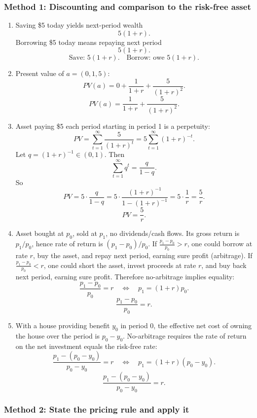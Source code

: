 \documentclass[12pt]{article}
\begin{document}
\subsubsection*{Method 1: Discounting and comparison to the risk-free asset}
\begin{enumerate}[label=(\alph*), leftmargin=*]
\item Saving \$5 today yields next-period wealth
\[
5(1+r).
\]
Borrowing \$5 today means repaying next period
\[
5(1+r).
\]
\[
\boxed{\text{Save: }5(1+r).\quad \text{Borrow: owe }5(1+r).}
\]

\item Present value of \(a=(0,1,5)\):
\[
PV(a)=0+\frac{1}{1+r}+\frac{5}{(1+r)^2}.
\]
\[
\boxed{PV(a)=\dfrac{1}{1+r}+\dfrac{5}{(1+r)^2}.}
\]

\item Asset paying \$5 each period starting in period 1 is a perpetuity:
\[
PV= \sum_{t=1}^{\infty}\frac{5}{(1+r)^t}
=5\sum_{t=1}^\infty (1+r)^{-t}.
\]
Let \(q=(1+r)^{-1}\in(0,1)\). Then
\[
\sum_{t=1}^\infty q^t=\frac{q}{1-q}.
\]
So
\[
PV=5\cdot \frac{q}{1-q}
=5\cdot \frac{(1+r)^{-1}}{1-(1+r)^{-1}}
=5\cdot \frac{1}{r}
=\frac{5}{r}.
\]
\[
\boxed{PV=\dfrac{5}{r}.}
\]

\item Asset bought at \(p_0\), sold at \(p_1\), no dividends/cash flows.
Its gross return is \(p_1/p_0\), hence rate of return is \((p_1-p_0)/p_0\).
If \(\frac{p_1-p_0}{p_0}>r\), one could borrow at rate \(r\), buy the asset, and repay next period, earning sure profit (arbitrage).
If \(\frac{p_1-p_0}{p_0}<r\), one could short the asset, invest proceeds at rate \(r\), and buy back next period, earning sure profit.
Therefore no-arbitrage implies equality:
\[
\frac{p_1-p_0}{p_0}=r
\quad\Longleftrightarrow\quad
p_1=(1+r)p_0.
\]
\[
\boxed{\frac{p_1-p_0}{p_0}=r.}
\]

\item With a house providing benefit \(y_0\) in period 0, the effective net cost of owning the house over the period is \(p_0-y_0\).
No-arbitrage requires the rate of return on the net investment equals the risk-free rate:
\[
\frac{p_1-(p_0-y_0)}{p_0-y_0}=r
\quad\Longleftrightarrow\quad
p_1=(1+r)(p_0-y_0).
\]
\[
\boxed{\frac{p_1-(p_0-y_0)}{p_0-y_0}=r.}
\]
\end{enumerate}

\subsubsection*{Method 2: State the pricing rule and apply it}
\end{document}
